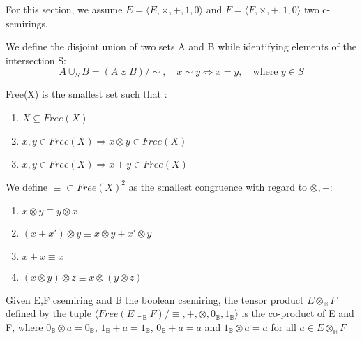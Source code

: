 For this section, we assume $E=\langle E, \times,+,1,0 \rangle$ and $F=\langle F, \times,+,1,0 \rangle$ two c-semirings. 

\begin{definition} We define the disjoint union of two sets A and B while identifying elements of the intersection S:	
	$$A \cup_{S}B = (A \uplus B)/\sim, \quad x \sim y \Leftrightarrow x=y,\quad \text{where } y\in S$$
\end{definition}


Free(X) is the smallest set such that :
\begin{enumerate}
	\item $X \subseteq Free(X)$
	\item $x,y \in Free(X) \Rightarrow x \otimes y \in Free(X)$
	\item $x,y \in Free(X) \Rightarrow x + y \in Free(X)$
\end{enumerate}

We define ${\equiv} \subset Free(X)^2$ as the smallest congruence with regard to $\otimes,+$:
\begin{enumerate}
	\item $x \otimes y \equiv y \otimes x$
	\item $(x+x')\otimes y \equiv x \otimes y + x' \otimes y$
	\item $x+x \equiv x$
	\item $(x \otimes y) \otimes z \equiv x \otimes (y \otimes z)$
\end{enumerate}


\begin{definition} Given E,F csemiring and $\mathbb{B}$ the boolean csemiring, the tensor product  $E\otimes_{\mathbb{B}}F$ defined by the tuple $\langle Free(E \cup_{\mathbb{B}} F) /\equiv, +, \otimes, 0_{\mathbb{B}}, 1_{\mathbb{B}} \rangle $ is the co-product of E and F, where $0_{\mathbb{B}} \otimes a = 0_{\mathbb{B}}$, $1_{\mathbb{B}} + a = 1_{\mathbb{B}}$, $0_{\mathbb{B}} + a = a$ and $1_{\mathbb{B}} \otimes a = a$ for all $a \in E\otimes_{\mathbb{B}}F$
\end{definition}


